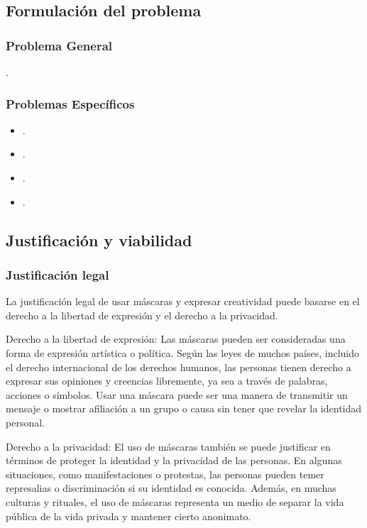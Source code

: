 \documentclass[12pt,a4paper]{article}
\begin{document}
\subsection{Formulación del problema}
\subsubsection{Problema General}
\problema.
\subsubsection{Problemas Específicos}
\begin{itemize}
	\item \problemae.
	\item \problemaee.
	\item \problemaeee.
	\item \problemaeeee.
\end{itemize}


\subsection{Justificación y viabilidad}

\subsubsection{Justificación legal}
La justificación legal de usar máscaras y expresar creatividad puede basarse en el derecho a la libertad de expresión y el derecho a la privacidad.

Derecho a la libertad de expresión: Las máscaras pueden ser consideradas una forma de expresión artística o política. Según las leyes de muchos países, incluido el derecho internacional de los derechos humanos, las personas tienen derecho a expresar sus opiniones y creencias libremente, ya sea a través de palabras, acciones o símbolos. Usar una máscara puede ser una manera de transmitir un mensaje o mostrar afiliación a un grupo o causa sin tener que revelar la identidad personal.

Derecho a la privacidad: El uso de máscaras también se puede justificar en términos de proteger la identidad y la privacidad de las personas. En algunas situaciones, como manifestaciones o protestas, las personas pueden temer represalias o discriminación si su identidad es conocida. Además, en muchas culturas y rituales, el uso de máscaras representa un medio de separar la vida pública de la vida privada y mantener cierto anonimato.
\end{document}
